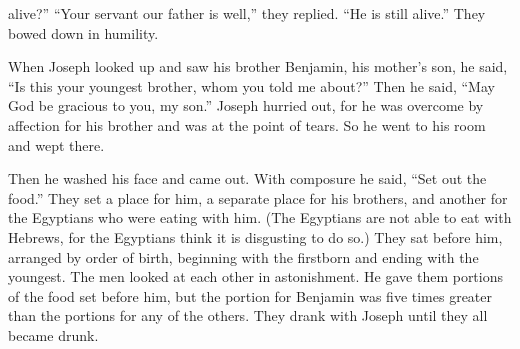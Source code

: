 {alive?”
“Your servant
our father
is well,”
they replied.
“He is still
alive.”
They bowed
down in humility.
\par }{\PP {}When Joseph looked
up and saw
his brother
Benjamin,
his mother’s
son,
he said,
“Is this
your youngest
brother,
whom
you told
me
about?” Then he said,
“May God
be gracious
to you, my son.”
Joseph
hurried
out, for
he was overcome by affection
for his brother
and was at the point of tears.
So he went
to his room
and wept
there.
\par }{\PP {}Then he washed
his face
and came out.
With composure
he said, “Set out
the food.”
They set
a place for him, a separate
place for
his brothers, and another for the Egyptians
who were eating
with
him. (The Egyptians
are not
able
to eat
with Hebrews,
for
the Egyptians
think it is
disgusting
to do so.)
They sat
before
him, arranged by order of birth, beginning
with the firstborn
and ending
with the youngest.
The men
looked at each
other
in astonishment.
He gave
them portions
of the food set before
him,
but the portion
for Benjamin
was five
times
greater
than the portions
for any
of the others. They drank
with
Joseph until they all became drunk.

}
